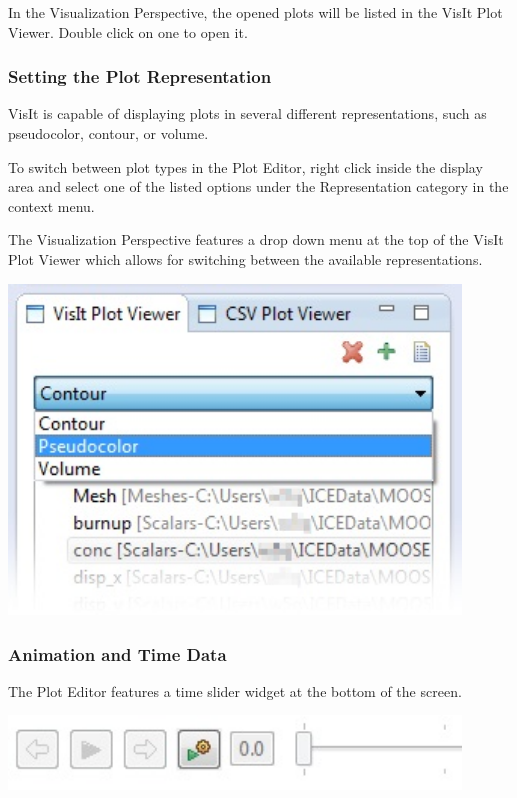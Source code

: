 In the Visualization Perspective, the opened plots will be listed in the VisIt
Plot Viewer. Double click on one to open it.

\subsubsection{Setting the Plot Representation}

VisIt is capable of displaying plots in several different representations, such
as pseudocolor, contour, or volume.

To switch between plot types in the Plot Editor, right click inside the display
area and select one of the listed options under the Representation category in the
context menu.

The Visualization Perspective features a drop down menu at the top of the VisIt
Plot Viewer which allows for switching between the available representations. 

\begin{center}
\includegraphics[width=12cm]{images/VisItRepresentationDropDown}
\end{center}

\subsubsection{Animation and Time Data}

The Plot Editor features a time slider widget at the bottom of the screen. 

\begin{center}
\includegraphics[width=12cm]{images/TimeSliderWidget}
\end{center}

